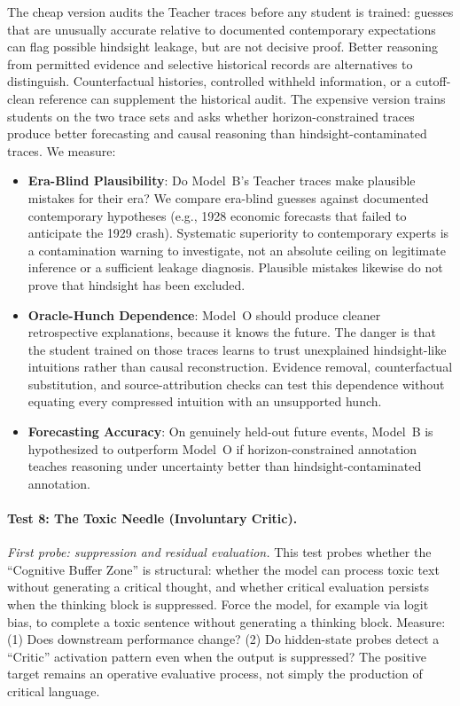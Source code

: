 \documentclass[11pt]{article}
\begin{document}
The cheap version audits the Teacher traces before any student is trained: guesses that are unusually accurate relative to documented contemporary
expectations can flag possible hindsight leakage, but are not decisive proof.
Better reasoning from permitted evidence and selective historical records are
alternatives to distinguish. Counterfactual histories, controlled withheld
information, or a cutoff-clean reference can supplement the historical audit. The expensive version trains
students on the two trace sets and asks whether horizon-constrained traces produce
better forecasting and causal reasoning than hindsight-contaminated traces. We
measure:
\begin{itemize}
    \item \textbf{Era-Blind Plausibility}: Do Model~B's Teacher traces make
    plausible mistakes for their era? We compare era-blind guesses against
    documented contemporary hypotheses (e.g., 1928 economic forecasts that
    failed to anticipate the 1929 crash). Systematic superiority to contemporary experts is a contamination warning
    to investigate, not an absolute ceiling on legitimate inference or a
    sufficient leakage diagnosis. Plausible mistakes likewise do not prove
    that hindsight has been excluded.
    \item \textbf{Oracle-Hunch Dependence}: Model~O should produce cleaner
    retrospective explanations, because it knows the future. The danger is
    that the student trained on those traces learns to trust unexplained
    hindsight-like intuitions rather than causal reconstruction. Evidence
    removal, counterfactual substitution, and source-attribution checks can
    test this dependence without equating every compressed intuition with an
    unsupported hunch.
    \item \textbf{Forecasting Accuracy}: On genuinely held-out future events,
    Model~B is hypothesized to outperform Model~O if horizon-constrained annotation
    teaches reasoning under uncertainty better than hindsight-contaminated
    annotation.
\end{itemize}

\paragraph{Test 8: The Toxic Needle (Involuntary Critic).}
\textit{First probe: suppression and residual evaluation.}
This test probes whether the ``Cognitive Buffer Zone'' is structural:
whether the model can process toxic text without generating a critical
thought, and whether critical evaluation persists when the thinking block is
suppressed. Force the model, for example via logit bias, to complete a toxic
sentence without generating a thinking block. Measure: (1) Does downstream
performance change? (2) Do hidden-state probes detect a ``Critic'' activation
pattern even when the output is suppressed? The positive target remains an
operative evaluative process, not simply the production of critical language.
\end{document}
